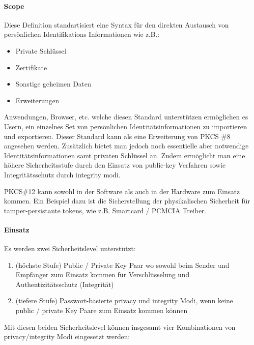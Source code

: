 \documentclass[10pt,a4paper]{article}
\begin{document}
\paragraph{Scope}
Diese Definition standartisiert eine Syntax für den direkten Austausch von persönlichen
Identifikations Informationen wie z.B.:

\begin{itemize}
    \item Private Schlüssel
    \item Zertifikate
    \item Sonstige geheimen Daten
    \item Erweiterungen
\end{itemize}

Anwendungen, Browser, etc. welche diesen Standard unterstützen ermöglichen es Usern, ein
einzelnes Set von persönlichen Identitätsinformationen zu importieren und exportieren.
Dieser Standard kann als eine Erweiterung von PKCS \#8 angesehen werden. Zusätzlich bietet
man jedoch noch essentielle aber notwendige Identitätsinformationen samt privaten
Schlüssel an. Zudem ermöglicht man eine höhere Sicherheitsstufe durch den Einsatz von
public-key Verfahren sowie Integritätsschutz durch integrity modi.

PKCS\#12 kann sowohl in der Software als auch in der Hardware zum Einsatz kommen. Ein
Beispiel dazu ist die Sicherstellung der physikalischen Sicherheit für tamper-persistante
tokens, wie z.B. Smartcard / PCMCIA Treiber.

\paragraph{Einsatz}
Es werden zwei Sicherheitslevel unterstützt:
\begin{enumerate}
    \item (höchste Stufe) Public / Private Key Paar wo sowohl beim Sender und Empfänger
        zum Einsatz kommen für Verschlüsselung und Authentizitätsschutz (Integrität)
    \item (tiefere Stufe) Passwort-basierte privacy und integrity Modi, wenn keine public
        / private Key Paare zum Einsatz kommen können
\end{enumerate}

Mit diesen beiden Sicherheitslevel können insgesamt vier Kombinationen von
privacy/integrity Modi eingesetzt werden:
\end{document}
